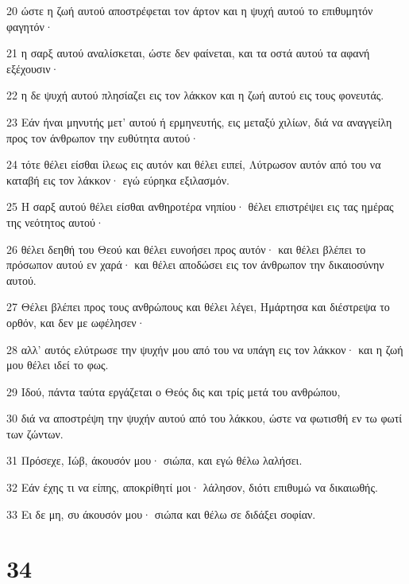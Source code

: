 \par 20 ώστε η ζωή αυτού αποστρέφεται τον άρτον και η ψυχή αυτού το επιθυμητόν φαγητόν·
\par 21 η σαρξ αυτού αναλίσκεται, ώστε δεν φαίνεται, και τα οστά αυτού τα αφανή εξέχουσιν·
\par 22 η δε ψυχή αυτού πλησίαζει εις τον λάκκον και η ζωή αυτού εις τους φονευτάς.
\par 23 Εάν ήναι μηνυτής μετ' αυτού ή ερμηνευτής, εις μεταξύ χιλίων, διά να αναγγείλη προς τον άνθρωπον την ευθύτητα αυτού·
\par 24 τότε θέλει είσθαι ίλεως εις αυτόν και θέλει ειπεί, Λύτρωσον αυτόν από του να καταβή εις τον λάκκον· εγώ εύρηκα εξιλασμόν.
\par 25 Η σαρξ αυτού θέλει είσθαι ανθηροτέρα νηπίου· θέλει επιστρέψει εις τας ημέρας της νεότητος αυτού·
\par 26 θέλει δεηθή του Θεού και θέλει ευνοήσει προς αυτόν· και θέλει βλέπει το πρόσωπον αυτού εν χαρά· και θέλει αποδώσει εις τον άνθρωπον την δικαιοσύνην αυτού.
\par 27 Θέλει βλέπει προς τους ανθρώπους και θέλει λέγει, Ημάρτησα και διέστρεψα το ορθόν, και δεν με ωφέλησεν·
\par 28 αλλ' αυτός ελύτρωσε την ψυχήν μου από του να υπάγη εις τον λάκκον· και η ζωή μου θέλει ιδεί το φως.
\par 29 Ιδού, πάντα ταύτα εργάζεται ο Θεός δις και τρίς μετά του ανθρώπου,
\par 30 διά να αποστρέψη την ψυχήν αυτού από του λάκκου, ώστε να φωτισθή εν τω φωτί των ζώντων.
\par 31 Πρόσεχε, Ιώβ, άκουσόν μου· σιώπα, και εγώ θέλω λαλήσει.
\par 32 Εάν έχης τι να είπης, αποκρίθητί μοι· λάλησον, διότι επιθυμώ να δικαιωθής.
\par 33 Ει δε μη, συ άκουσόν μου· σιώπα και θέλω σε διδάξει σοφίαν.

\chapter{34}

